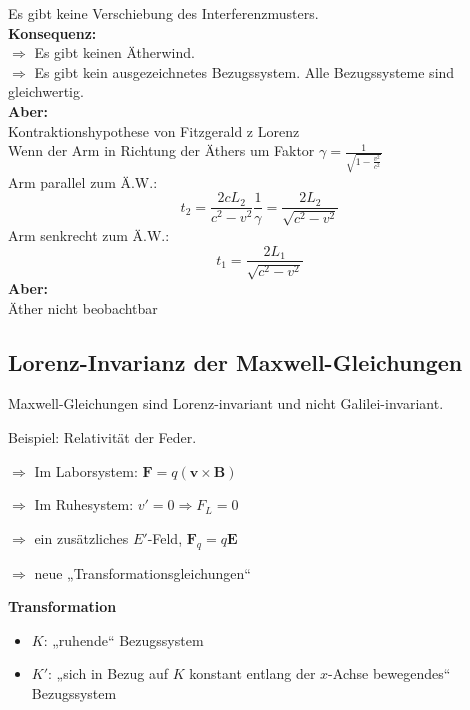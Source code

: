 \documentclass[titlepage,11pt,a4paper,ngerman]{report}
\renewcommand{\vec}[1]{\boldsymbol{#1}}
\begin{document}
Es gibt keine Verschiebung des Interferenzmusters.\\[5pt]
\textbf{Konsequenz:}\\
$ \Rightarrow $ Es gibt keinen Ätherwind.\\
$ \Rightarrow $ Es gibt kein ausgezeichnetes Bezugssystem. Alle Bezugssysteme sind gleichwertig.\\[5pt]
\textbf{Aber:}\\
Kontraktionshypothese von Fitzgerald z Lorenz\\
Wenn der Arm in Richtung der Äthers um Faktor $ \gamma = \frac{1}{\sqrt{1 - \frac{v^2}{c^2}}} $ \\
Arm parallel zum Ä.W.:
\begin{equation*}
t_2 = \frac{2cL_2}{c^2 - v^2} \frac{1}{\gamma} = \frac{2 L_2}{\sqrt{c^2 - v^2}}
\end{equation*}
Arm senkrecht zum Ä.W.:
\begin{equation*}
t_1 = \frac{2L_1}{\sqrt{c^2 - v^2}}
\end{equation*}
\textbf{Aber:}\\
Äther nicht beobachtbar

\subsection{Lorenz-Invarianz der Maxwell-Gleichungen}

Maxwell-Gleichungen sind Lorenz-invariant und nicht Galilei-invariant.

Beispiel: Relativität der Feder. 







$\Rightarrow$ Im Laborsystem: $\vec{F}=q(\vec{v}\times\vec{B})$

$\Rightarrow$ Im Ruhesystem: $v'=0\Rightarrow F_L=0$ \begin{LARGE}\lightning\end{LARGE}

$\Rightarrow$ ein zusätzliches $E'$-Feld, $\vec{F}_q=q\vec{E}$

$\Rightarrow$ neue „Transformationsgleichungen“

\textbf{Transformation}
\begin{itemize}
	\item $K$: „ruhende“ Bezugssystem
	\item $K'$: „sich in Bezug auf $K$ konstant entlang der $x$-Achse bewegendes“ Bezugssystem
\end{itemize}
\end{document}

